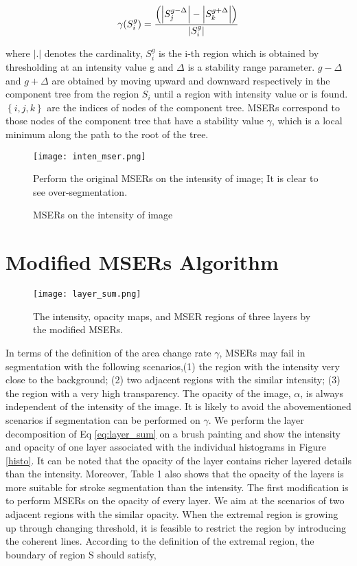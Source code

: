 \[ \gamma(S_i^g) = \frac{\left ( \left |  S_j^{g-\Delta} \right |-\left |  S_k^{g+\Delta} \right | \right )}{\arrowvert S_i^g\arrowvert} \]

where $ \left | .  \right |$  denotes the cardinality, $ S_{i}^{g} $  is the i-th region which is obtained by thresholding at an intensity value g and $\Delta $ is a stability range parameter. $  g-\Delta $ and $ g+\Delta $ are obtained by moving upward and downward respectively in the component tree from the region $ S_{i} $ until a region with intensity value   or  is found. $ \left \{ i,j,k \right \}$ are the indices of nodes of the component tree. MSERs correspond to those nodes of the component tree that have a stability value $\gamma$, which is a local minimum along the path to the root of the tree.

\begin{figure}[H]
	\centering 
	\texttt{[image: inten\_mser.png]}
	\caption{  MSERs on the intensity of image}
	\medskip
	\small
	Perform the original MSERs on the intensity of image; It is clear to see over-segmentation.
\end{figure}

\section{Modified MSERs Algorithm}
\begin{figure}[H]
	\centering 
	\texttt{[image: layer\_sum.png]}
	\caption{The intensity, opacity maps, and MSER regions of three layers by the modified MSERs.}
	\label{mser:alpha}
\end{figure}
In terms of the definition of the area change rate $\gamma$, MSERs may fail in segmentation with the following scenarios,\newline (1) the region with the intensity very close to the background; \newline (2) two adjacent regions with the similar intensity; \newline (3) the region with a very high transparency. \newline The opacity of the image, $\alpha$, is always independent of the intensity of the image. It is likely to avoid the abovementioned scenarios if segmentation can be performed on $\gamma$. We perform the layer decomposition of Eq \ref{eq:layer_sum} on a brush painting and show the intensity and opacity of one layer associated with the individual histograms in Figure \ref{histo}. It can be noted that the opacity of the layer contains richer layered details than the intensity. Moreover, Table 1 also shows that the opacity of the layers is more suitable for stroke segmentation than the intensity. The first modification is to perform MSERs on the opacity of every layer.
We aim at the scenarios of two adjacent regions with the similar opacity. When the extremal region is growing up through changing threshold, it is feasible to restrict the region by introducing the coherent lines. According to the definition of the extremal region, the boundary of region S should satisfy,

